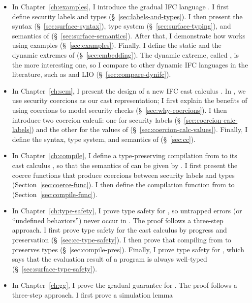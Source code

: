 \begin{itemize}
  \item In Chapter~\ref{ch:examples}, I introduce the gradual IFC language
    \Surface. I first define security labels and types
    (\S~\ref{sec:labels-and-types}). I then present the syntax
    (\S~\ref{sec:surface-syntax}), type system (\S~\ref{sec:surface-typing}),
    and semantics of \Surface (\S~\ref{sec:surface-semantics}). After that, I
    demonstrate how \Surface works using examples (\S~\ref{sec:examples}).
    Finally, I define the static and the dynamic extremes of \Surface
    (\S~\ref{sec:embedding}). The dynamic extreme, called \DynIFC, is the more
    interesting one, so I compare \DynIFC to other dynamic IFC languages in the
    literature, such as \laminfo and LIO (\S~\ref{sec:compare-dynifc}).
  \item In Chapter~\ref{ch:sem}, I present the design of a new IFC cast calculus
    \CC. In \CC, we use security coercions as our cast representation; I first
    explain the benefits of using coercions to model security checks
    (\S~\ref{sec:why-coercions}). I then introduce two coercion calculi: one for
    security labels (\S~\ref{sec:coercion-calc-labels}) and the other for the
    values of \CC (\S~\ref{sec:coercion-calc-values}). Finally, I define the
    syntax, type system, and semantics of \CC (\S~\ref{sec:cc}).
  \item In Chapter~\ref{ch:compile}, I define a type-preserving compilation from
    \Surface to its cast calculus \CC, so that the semantics of \Surface can be
    given by \CC. I first present the coerce functions that produce coercions
    between security labels and types (Section~\ref{sec:coerce-func}). I then
    define the compilation function from \Surface to \CC
    (Section~\ref{sec:compile-func}).
  \item In Chapter~\ref{ch:type-safety}, I prove type safety for \Surface, so
    untrapped errors (or ``undefined behaviors'') never occur in \Surface. The
    proof follows a three-step approach. I first prove type safety for the cast
    calculus \CC by progress and preservation (\S~\ref{sec:cc-type-safety}). I
    then prove that compiling from \Surface to \CC preserves types
    (\S~\ref{sec:compile-pres}). Finally, I prove type safety for \Surface,
    which says that the evaluation result of a \Surface program is always
    well-typed (\S~\ref{sec:surface-type-safety}).
  \item In Chapter~\ref{ch:gg}, I prove the gradual guarantee for \Surface. The
    proof follows a three-step approach. I first prove a simulation lemma

\end{itemize}
